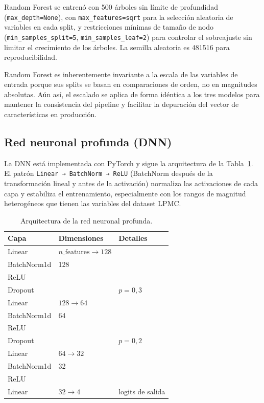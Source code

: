 Random Forest se entrenó con 500 árboles sin límite de profundidad (\texttt{max\_depth=None}), con \texttt{max\_features=\textquotesingle{}sqrt\textquotesingle{}} para la selección aleatoria de variables en cada split, y restricciones mínimas de tamaño de nodo (\texttt{min\_samples\_split=5}, \texttt{min\_samples\_leaf=2}) para controlar el sobreajuste sin limitar el crecimiento de los árboles. La semilla aleatoria es 481516 para reproducibilidad.

Random Forest es inherentemente invariante a la escala de las variables de entrada porque sus splits se basan en comparaciones de orden, no en magnitudes absolutas. Aún así, el escalado se aplica de forma idéntica a los tres modelos para mantener la consistencia del pipeline y facilitar la depuración del vector de características en producción.

\subsection{Red neuronal profunda (DNN)}

La DNN está implementada con PyTorch y sigue la arquitectura de la Tabla~\ref{tab:dnn_arch}. El patrón \texttt{Linear~→~BatchNorm~→~ReLU} (BatchNorm después de la transformación lineal y antes de la activación) normaliza las activaciones de cada capa y estabiliza el entrenamiento, especialmente con los rangos de magnitud heterogéneos que tienen las variables del dataset LPMC.

\begin{table}[htbp]
  \caption{Arquitectura de la red neuronal profunda.}
  \label{tab:dnn_arch}
  \centering
  \begin{tabular}{lll}
    \toprule
    \textbf{Capa} & \textbf{Dimensiones} & \textbf{Detalles} \\
    \midrule
    Linear        & $n\_\text{features} \to 128$ & \\
    BatchNorm1d   & 128                  & \\
    ReLU          &                      & \\
    Dropout       &                      & $p = 0{,}3$ \\
    Linear        & $128 \to 64$         & \\
    BatchNorm1d   & 64                   & \\
    ReLU          &                      & \\
    Dropout       &                      & $p = 0{,}2$ \\
    Linear        & $64 \to 32$          & \\
    BatchNorm1d   & 32                   & \\
    ReLU          &                      & \\
    Linear        & $32 \to 4$           & logits de salida \\
    \bottomrule
  \end{tabular}
\end{table}

